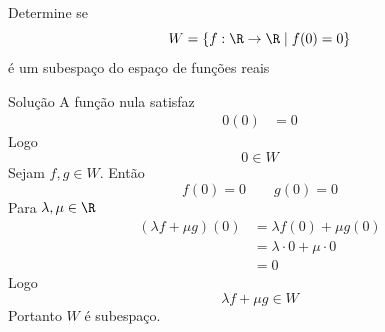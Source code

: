 \begin{question}
  Determine se
  \[
  W=
  \left\{
  f:\R\to\R
  \;\middle|\;
  f(0)=0
  \right\}
  \]
  é um subespaço do espaço de funções reais
\end{question}

\begin{resolution}{Solução}
  A função nula satisfaz
  \begin{align*}
  0(0)&=0
  \end{align*}
  Logo
  \[
  0\in W
  \]
  Sejam $f,g\in W$.
  Então
  \[
  f(0)=0
  \qquad
  g(0)=0
  \]
  Para $\lambda,\mu\in\R$
  \begin{align*}
  (\lambda f+\mu g)(0)
  &=\lambda f(0)+\mu g(0)\\
  &=\lambda\cdot0+\mu\cdot0\\
  &=0
  \end{align*}
  Logo
  \[
  \lambda f+\mu g\in W
  \]
  Portanto $W$ é subespaço.

\end{resolution}

\endinput
